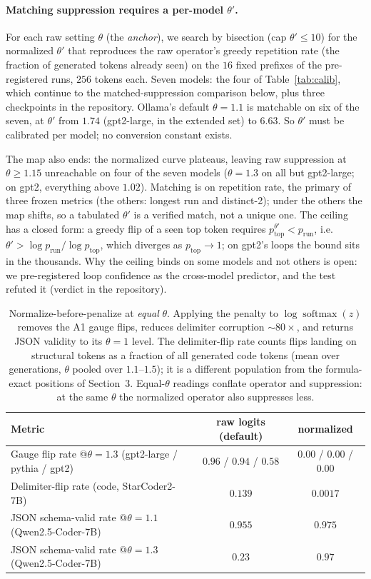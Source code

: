 \documentclass[11pt]{article}
\newcommand{\thp}{\theta}
\newcommand{\softmax}{\operatorname{softmax}}
\begin{document}
\paragraph{Matching suppression requires a per-model $\thp'$.} For each raw setting $\thp$ (the
\emph{anchor}), we search by bisection (cap $\thp'\le10$) for the normalized $\thp'$ that
reproduces the raw operator's greedy repetition rate (the fraction of generated tokens already
seen) on the $16$ fixed prefixes of the pre-registered runs, $256$ tokens each. Seven
models: the four of Table~\ref{tab:calib}, which continue to the matched-suppression comparison
below, plus three checkpoints in the repository. Ollama's default $\thp=1.1$ is matchable on six
of the seven, at $\thp'$ from
$1.74$ (gpt2-large, in the extended set) to $6.63$. So $\thp'$ must be calibrated per model; no
conversion constant exists.

The map also ends: the normalized
curve plateaus, leaving raw suppression at $\thp\ge1.15$ unreachable on four of the seven models
($\thp=1.3$ on all but gpt2-large; on gpt2, everything above $1.02$). Matching is on repetition
rate, the primary of three frozen metrics (the others: longest run and distinct-2); under the
others the map shifts, so a tabulated
$\thp'$ is a verified match, not a unique one. The ceiling has a closed form: a greedy flip of
a seen top token requires $p_{\mathrm{top}}^{\thp'} < p_{\mathrm{run}}$, i.e.\
$\thp' > \log p_{\mathrm{run}} / \log p_{\mathrm{top}}$, which diverges as
$p_{\mathrm{top}}\to1$; on gpt2's loops the bound sits in the thousands. Why the ceiling
binds on some models and not others is open: we pre-registered loop confidence as the
cross-model predictor, and the test refuted it (verdict in the repository).

\begin{table}[t]
\centering
\caption{Normalize-before-penalize at \emph{equal} $\thp$. Applying the penalty to
$\log\softmax(z)$ removes the A1 gauge flips, reduces delimiter corruption $\sim$$80\times$, and
returns JSON validity to its $\thp=1$ level. The delimiter-flip rate counts flips landing on
structural tokens as a fraction of all generated code tokens (mean over generations, $\thp$
pooled over $1.1$--$1.5$); it is a different population from the formula-exact positions of
Section~3. Equal-$\thp$ readings conflate operator and suppression: at the same $\thp$ the
normalized operator also suppresses less.}
\label{tab:fix}
\begin{tabular}{lcc}
\toprule
Metric & raw logits (default) & normalized \\
\midrule
Gauge flip rate @$\thp{=}1.3$ (gpt2-large / pythia / gpt2) & $0.96$ / $0.94$ / $0.58$ & $0.00$ / $0.00$ / $0.00$ \\
Delimiter-flip rate (code, StarCoder2-7B)              & $0.139$ & $0.0017$ \\
JSON schema-valid rate @$\thp{=}1.1$ (Qwen2.5-Coder-7B) & $0.955$ & $0.975$ \\
JSON schema-valid rate @$\thp{=}1.3$ (Qwen2.5-Coder-7B) & $0.23$ & $0.97$ \\
\bottomrule
\end{tabular}
\end{table}
\end{document}
